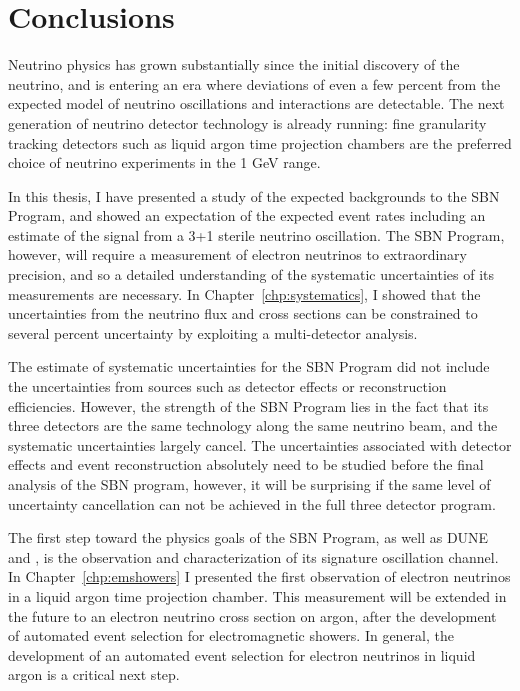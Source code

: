 \chapter{Conclusions} 

Neutrino physics has grown substantially since the initial discovery of the neutrino, and is entering an era where deviations of even a few percent from the expected model of neutrino oscillations and interactions are detectable.  The next generation of neutrino detector technology is already running: fine granularity tracking detectors such as liquid argon time projection chambers are the preferred choice of neutrino experiments in the 1 GeV range.

In this thesis, I have presented a study of the expected backgrounds to the SBN Program, and showed an expectation of the expected event rates including an estimate of the signal from a 3+1 sterile neutrino oscillation.  The SBN Program, however, will require a measurement of electron neutrinos to extraordinary precision, and so a detailed understanding of the systematic uncertainties of its measurements are necessary.  In Chapter~\ref{chp:systematics}, I showed that the uncertainties from the neutrino flux and cross sections can be constrained to several percent uncertainty by exploiting a multi-detector analysis.

The estimate of systematic uncertainties for the SBN Program did not include the uncertainties from sources such as detector effects or reconstruction efficiencies.  However, the strength of the SBN Program lies in the fact that its three detectors are the same technology along the same neutrino beam, and the systematic uncertainties largely cancel.  The uncertainties associated with detector effects and event reconstruction absolutely need to be studied before the final analysis of the SBN program, however, it will be surprising if the same level of uncertainty cancellation can not be achieved in the full three detector program.

The first step toward the physics goals of the SBN Program, as well as DUNE and \uboone, is the observation and characterization of its signature oscillation channel.  In Chapter~\ref{chp:emshowers} I presented the first observation of electron neutrinos in a liquid argon time projection chamber.  This measurement will be extended in the future to an electron neutrino cross section on argon, after the development of automated event selection for electromagnetic showers.  In general, the development of an automated event selection for electron neutrinos in liquid argon is a critical next step.

